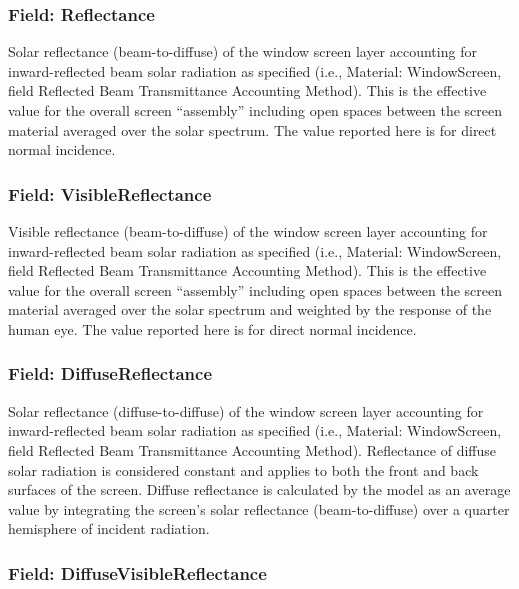 \subsubsection{Field: Reflectance}\label{field-reflectance}

Solar reflectance (beam-to-diffuse) of the window screen layer accounting for inward-reflected beam solar radiation as specified (i.e., Material: WindowScreen, field Reflected Beam Transmittance Accounting Method). This is the effective value for the overall screen ``assembly'' including open spaces between the screen material averaged over the solar spectrum. The value reported here is for direct normal incidence.

\subsubsection{Field: VisibleReflectance}\label{field-visiblereflectance}

Visible reflectance (beam-to-diffuse) of the window screen layer accounting for inward-reflected beam solar radiation as specified (i.e., Material: WindowScreen, field Reflected Beam Transmittance Accounting Method). This is the effective value for the overall screen ``assembly'' including open spaces between the screen material averaged over the solar spectrum and weighted by the response of the human eye. The value reported here is for direct normal incidence.

\subsubsection{Field: DiffuseReflectance}\label{field-diffusereflectance}

Solar reflectance (diffuse-to-diffuse) of the window screen layer accounting for inward-reflected beam solar radiation as specified (i.e., Material: WindowScreen, field Reflected Beam Transmittance Accounting Method). Reflectance of diffuse solar radiation is considered constant and applies to both the front and back surfaces of the screen. Diffuse reflectance is calculated by the model as an average value by integrating the screen's solar reflectance (beam-to-diffuse) over a quarter hemisphere of incident radiation.

\subsubsection{Field: DiffuseVisibleReflectance}\label{field-diffusevisiblereflectance}

